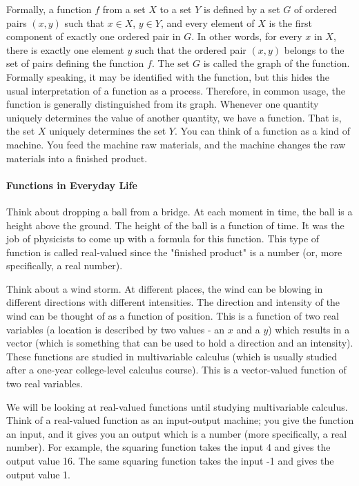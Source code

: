 Formally, a function $f$ from a set $X$ to a set $Y$ is defined by a set $G$ of ordered pairs $(x, y)$ such that $x \in X$, $y \in Y$, and every element of $X$ is the first component of exactly one ordered pair in $G$. In other words, for every $x$ in $X$, there is exactly one element $y$ such that the ordered pair $(x, y)$ belongs to the set of pairs defining the function $f$. The set $G$ is called the graph of the function. Formally speaking, it may be identified with the function, but this hides the usual interpretation of a function as a process. Therefore, in common usage, the function is generally distinguished from its graph. Whenever one quantity uniquely determines the value of another quantity, we have a function. That is, the set $X$ uniquely determines the set $Y$. You can think of a function as a kind of machine. You feed the machine raw materials, and the machine changes the raw materials into a finished product.

\paragraph{Functions in Everyday Life}

Think about dropping a ball from a bridge. At each moment in time, the ball is a height above the ground. The height of the ball is a function of time. It was the job of physicists to come up with a formula for this function. This type of function is called real-valued since the "finished product" is a number (or, more specifically, a real number).

Think about a wind storm. At different places, the wind can be blowing in different directions with different intensities. The direction and intensity of the wind can be thought of as a function of position. This is a function of two real variables (a location is described by two values - an $x$ and a $y$) which results in a vector (which is something that can be used to hold a direction and an intensity). These functions are studied in multivariable calculus (which is usually studied after a one-year college-level calculus course). This is a vector-valued function of two real variables.

We will be looking at real-valued functions until studying multivariable calculus. Think of a real-valued function as an input-output machine; you give the function an input, and it gives you an output which is a number (more specifically, a real number). For example, the squaring function takes the input 4 and gives the output value 16. The same squaring function takes the input -1 and gives the output value 1.

